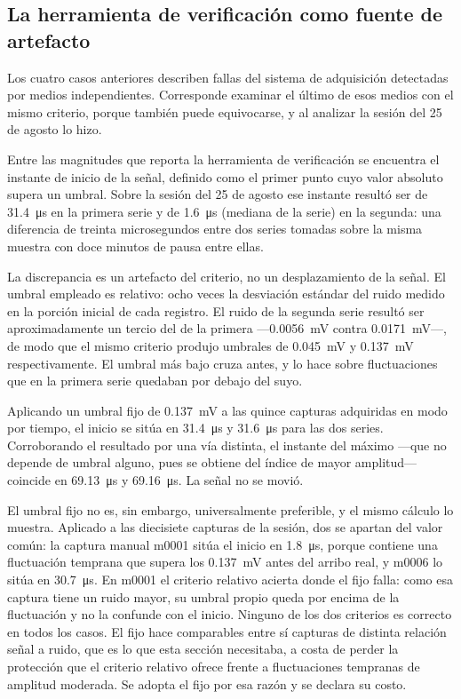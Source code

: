 \subsection{La herramienta de verificación como fuente de artefacto}
\label{sec:falla_umbral}

Los cuatro casos anteriores describen fallas del sistema de adquisición
detectadas por medios independientes. Corresponde examinar el último de
esos medios con el mismo criterio, porque también puede equivocarse, y
al analizar la sesión del 25 de agosto lo hizo.

Entre las magnitudes que reporta la herramienta de verificación se
encuentra el instante de inicio de la señal, definido como el primer
punto cuyo valor absoluto supera un umbral. Sobre la sesión del 25 de
agosto ese instante resultó ser de \SI{31.4}{\micro\second} en la
primera serie y de \SI{1.6}{\micro\second} (mediana de la serie) en la
segunda: una diferencia de treinta microsegundos entre dos series
tomadas sobre la misma muestra con doce minutos de pausa entre ellas.

La discrepancia es un artefacto del criterio, no un desplazamiento de la
señal. El umbral empleado es relativo: ocho veces la desviación estándar
del ruido medido en la porción inicial de cada registro. El ruido de la
segunda serie resultó ser aproximadamente un tercio del de la primera
---\SI{0.0056}{\milli\volt} contra \SI{0.0171}{\milli\volt}---, de modo
que el mismo criterio produjo umbrales de \SI{0.045}{\milli\volt} y
\SI{0.137}{\milli\volt} respectivamente. El umbral más bajo cruza antes,
y lo hace sobre fluctuaciones que en la primera serie quedaban por
debajo del suyo.

Aplicando un umbral fijo de \SI{0.137}{\milli\volt} a las quince
capturas adquiridas en modo por tiempo, el inicio se sitúa en
\SI{31.4}{\micro\second} y \SI{31.6}{\micro\second} para las dos series.
Corroborando el resultado por una vía distinta, el instante del máximo
---que no depende de umbral alguno, pues se obtiene del índice de mayor
amplitud--- coincide en \SI{69.13}{\micro\second} y
\SI{69.16}{\micro\second}. La señal no se movió.

El umbral fijo no es, sin embargo, universalmente preferible, y el
mismo cálculo lo muestra. Aplicado a las diecisiete capturas de la
sesión, dos se apartan del valor común: la captura manual m0001 sitúa el
inicio en \SI{1.8}{\micro\second}, porque contiene una fluctuación
temprana que supera los \SI{0.137}{\milli\volt} antes del arribo real,
y m0006 lo sitúa en \SI{30.7}{\micro\second}. En m0001 el criterio
relativo acierta donde el fijo falla: como esa captura tiene un ruido
mayor, su umbral propio queda por encima de la fluctuación y no la
confunde con el inicio. Ninguno de los dos criterios es correcto en
todos los casos. El fijo hace comparables entre sí capturas de distinta
relación señal a ruido, que es lo que esta sección necesitaba, a costa
de perder la protección que el criterio relativo ofrece frente a
fluctuaciones tempranas de amplitud moderada. Se adopta el fijo por esa
razón y se declara su costo.

